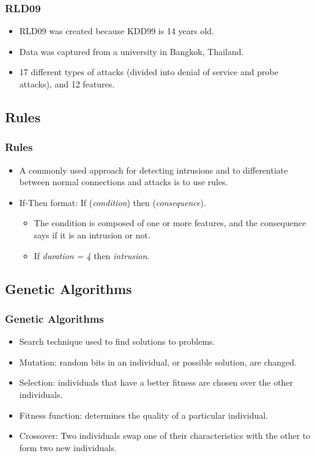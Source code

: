 \documentclass{beamer}
\begin{document}
\begin{frame}
  \frametitle{RLD09}
	\begin{itemize}
		\item RLD09 was created because KDD99 is 14 years old.
		\item Data was captured from a university in Bangkok, Thailand.
		\item 17 different types of attacks (divided into denial of service and probe attacks), and 12 features.
	\end{itemize}
\end{frame}


\subsection{Rules}
\begin{frame}
  \frametitle{Rules}
	\begin{itemize}
		\item A commonly used approach for detecting intrusions and to differentiate between normal connections and attacks is to use rules.
		\item If-Then format: If (\emph{condition}) then (\emph{consequence}).
		\begin{itemize}
			\item The condition is composed of one or more features, and the consequence says if it is an intrusion or not.
			\item If \emph{duration = 4} then \emph{intrusion}.
		\end{itemize}				
	\end{itemize}
\end{frame}


\subsection{Genetic Algorithms}
\begin{frame}
  \frametitle{Genetic Algorithms}
	\begin{itemize}
		\item Search technique used to find solutions to problems.
		\item Mutation: random bits in an individual, or possible solution, are changed.
		\item Selection: individuals that have a better fitness are chosen over the other individuals.
		\item Fitness function: determines the quality of a particular individual.
		\item Crossover: Two individuals swap one of their characteristics with the other to form two new individuals.
	\end{itemize}
\end{frame}
\end{document}
